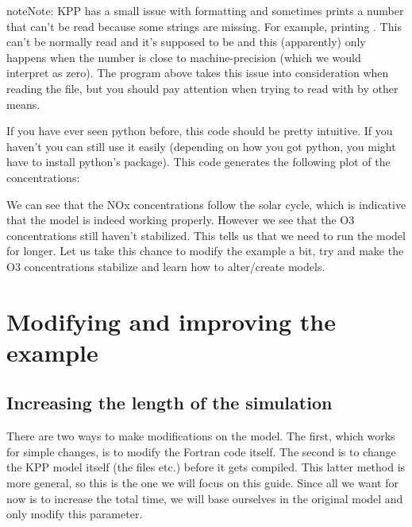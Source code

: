 \documentclass[letterpaper,10pt,openany,oneside]{sphinxmanual}
\begin{document}
\begin{notice}{note}{Note:}
KPP has a small issue with formatting and sometimes prints a number that can't be read because
some strings are missing. For example, printing . This can't be normally read
and it's supposed to be  and this (apparently) only happens when the number
is close to machine-precision (which we would interpret as zero). The program above takes
this issue into consideration when reading the file, but you should pay attention when trying
to read with by other means.
\end{notice}

If you have ever seen python before, this code should be pretty intuitive. If
you haven't you can still use it easily (depending on how you got python, you
might have to install python's  package).  This code generates the
following plot of the concentrations:
\label{running:test1-time}\begin{figure}[htbp]
\centering

\noindent{}
\label{running:test1-time}\end{figure}

We can see that the NOx concentrations follow the solar cycle, which is
indicative that the model is indeed working properly. However we see that the
O3 concentrations still haven't stabilized. This tells us that we need to run
the model for longer. Let us take this chance to modify the 
example a bit, try and make the O3 concentrations stabilize and learn how to
alter/create models.


\chapter{Modifying and improving the example}
\label{improving:modifying-and-improving-the-example}\label{improving::doc}

\section{Increasing the length of the simulation}
\label{improving:increasing-the-length-of-the-simulation}
There are two ways to make modifications on the model. The first, which works
for simple changes, is to modify the Fortran code itself. The second is to
change the KPP model itself (the  files etc.) before it gets compiled.
This latter method is more general, so this is the one we will focus on this
guide.  Since all we want for now is to increase the total time, we will base
ourselves in the original  model and only modify this
parameter.
\end{document}
